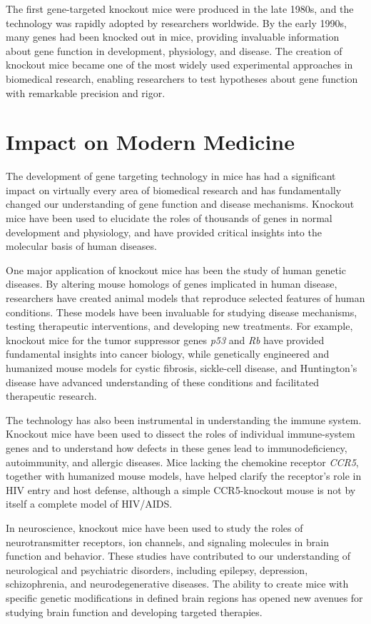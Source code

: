 The first gene-targeted knockout mice were produced in the late 1980s, and the technology was rapidly adopted by researchers worldwide. By the early 1990s, many genes had been knocked out in mice, providing invaluable information about gene function in development, physiology, and disease. The creation of knockout mice became one of the most widely used experimental approaches in biomedical research, enabling researchers to test hypotheses about gene function with remarkable precision and rigor.

\section{Impact on Modern Medicine}

The development of gene targeting technology in mice has had a significant impact on virtually every area of biomedical research and has fundamentally changed our understanding of gene function and disease mechanisms. Knockout mice have been used to elucidate the roles of thousands of genes in normal development and physiology, and have provided critical insights into the molecular basis of human diseases.

One major application of knockout mice has been the study of human genetic diseases. By altering mouse homologs of genes implicated in human disease, researchers have created animal models that reproduce selected features of human conditions. These models have been invaluable for studying disease mechanisms, testing therapeutic interventions, and developing new treatments. For example, knockout mice for the tumor suppressor genes \textit{p53} and \textit{Rb} have provided fundamental insights into cancer biology, while genetically engineered and humanized mouse models for cystic fibrosis, sickle-cell disease, and Huntington's disease have advanced understanding of these conditions and facilitated therapeutic research.

The technology has also been instrumental in understanding the immune system. Knockout mice have been used to dissect the roles of individual immune-system genes and to understand how defects in these genes lead to immunodeficiency, autoimmunity, and allergic diseases. Mice lacking the chemokine receptor \textit{CCR5}, together with humanized mouse models, have helped clarify the receptor's role in HIV entry and host defense, although a simple CCR5-knockout mouse is not by itself a complete model of HIV/AIDS.

In neuroscience, knockout mice have been used to study the roles of neurotransmitter receptors, ion channels, and signaling molecules in brain function and behavior. These studies have contributed to our understanding of neurological and psychiatric disorders, including epilepsy, depression, schizophrenia, and neurodegenerative diseases. The ability to create mice with specific genetic modifications in defined brain regions has opened new avenues for studying brain function and developing targeted therapies.


